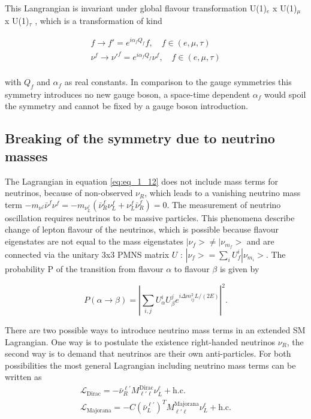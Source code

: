 This Langrangian is invariant under global flavour transformation U(1)$_{e}$ x U(1)$_{\mu}$ x U(1)$_{\tau}$ \cite{LFV1, LFV2}, which is a transformation of kind 

\begin{equation}
	\label{eq:eq_1_13}
	\begin{split}
		f \rightarrow f' = e^{i\alpha_{f}Q_{f}}f, \quad f \in (e, \mu, \tau) \\
		\nu^{f} \rightarrow \nu'^{f} = e^{i\alpha_{f}Q_{f}}\nu^{f}, \quad f \in (e, \mu, \tau) \\
	\end{split}
\end{equation}

with $Q_{f}$ and $\alpha_{f}$ as real constants. In comparison to the gauge symmetries this symmetry introduces no new gauge boson, a space-time dependent $\alpha_{f}$ would spoil the symmetry and cannot be fixed by a gauge boson introduction.

\subsection{Breaking of the symmetry due to neutrino masses}
\label{sec:section_1_3_2}

The Lagrangian in equation \ref{eq:eq_1_12} does not include mass terms for neutrinos, because of non-observed $\nu_R$, which leads to a vanishing neutrino mass term $-m_{\nu^{f}}\bar{\nu}^{f}\nu^{f} = -m_{\nu^{f}_{L}}(\bar{\nu}^{f}_{R}\nu^{f}_{L} + {\nu}^{f}_{L}\bar{\nu}^{f}_{R}) = 0$. The measurement of neutrino oscillation \cite{NEUTRINOOSC} requires neutrinos to be massive particles. This phenomena describe change of lepton flavour of the neutrinos, which is possible because flavour eigenstates are not equal to the mass eigenstates $|\nu_{f}> \neq |\nu_{m_{f}}>$ and are connected via the unitary 3x3 PMNS matrix $U$ \cite{PMNS}: $|\nu_{f}> =  \sum_{i} U^{i}_{f}|\nu_{m_{i}}>$. The probability P of the transition from flavour $\alpha$ to flavour $\beta$ \cite{NEUTRINOPROB} is given by 

\begin{equation}
	\label{eq:eq_1_14}
	P(\alpha \rightarrow \beta) = |\sum_{i, j} U_{\alpha}^{i} U_{\beta}^{j} e^{i\Delta m^2_{ij}L/(2E)}|^2.
\end{equation}

There are two possible ways to introduce neutrino mass terms in an extended \gls{SM} Lagrangian. One way is to postulate the existence right-handed neutrinos $\nu_R$, the second way is to demand that neutrinos are their own anti-particles. For both possibilities the most general Lagrangian including neutrino mass terms can be written as
\begin{equation}
	\label{eq:eq_1_15}
	\begin{split}
		\mathcal{L}_{\text{Dirac}} = -\bar{\nu}^{\ell'}_{R}M^{\text{Dirac}}_{\ell'\ell} \nu^{\ell}_{L} + \text{h.c.} \\
		\mathcal{L}_{\text{Majorana}} = -C(\bar{\nu}^{\ell'}_{L})^{T}M^{\text{Majorana}}_{\ell'\ell} \nu^{\ell}_{L} + \text{h.c.} 
	\end{split}
\end{equation}

